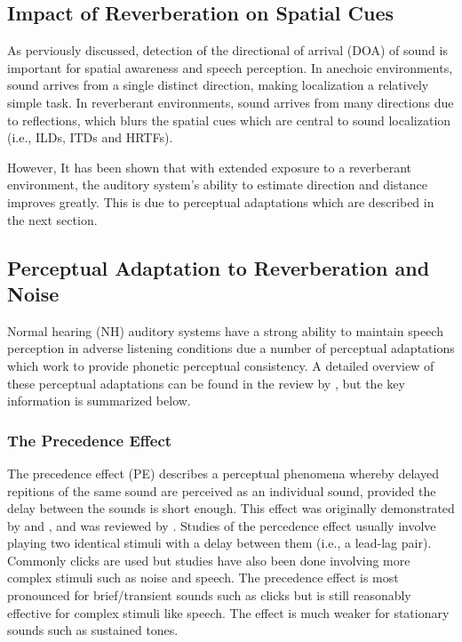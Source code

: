 \subsection{Impact of Reverberation on Spatial Cues}

As perviously discussed, detection of the directional of arrival (DOA) of sound is important for spatial awareness and speech perception. In anechoic environments, sound arrives from a single distinct direction, making localization a relatively simple task. In reverberant environments, sound arrives from many directions due to reflections, which blurs the spatial cues which are central to sound localization (i.e., ILDs, ITDs and HRTFs).

However, It has been shown that with extended exposure to a reverberant environment, the auditory system's ability to estimate direction and distance improves greatly. This is due to perceptual adaptations which are described in the next section.

\subsection{Perceptual Adaptation to Reverberation and Noise}

Normal hearing (NH) auditory systems have a strong ability to maintain speech perception in adverse listening conditions due a number of perceptual adaptations which work to provide phonetic perceptual consistency. A detailed overview of these perceptual adaptations can be found in the review by \cite{tsironis2024adaptation}, but the key information is summarized below.

\subsubsection{The Precedence Effect}

The precedence effect (PE) describes a perceptual phenomena whereby delayed repitions of the same sound are perceived as an individual sound, provided the delay between the sounds is short enough. This effect was originally demonstrated by \cite{wallach1949precedence} and \cite{haas1951einflubeta}, and was reviewed by \cite{litovsky1999precedence}. Studies of the percedence effect usually involve playing two identical stimuli with a delay between them (i.e., a lead-lag pair). Commonly clicks are used but studies have also been done involving more complex stimuli such as noise and speech. The precedence effect is most pronounced for brief/transient sounds such as clicks but is still reasonably effective for complex stimuli like speech. The effect is much weaker for stationary sounds such as sustained tones. 

